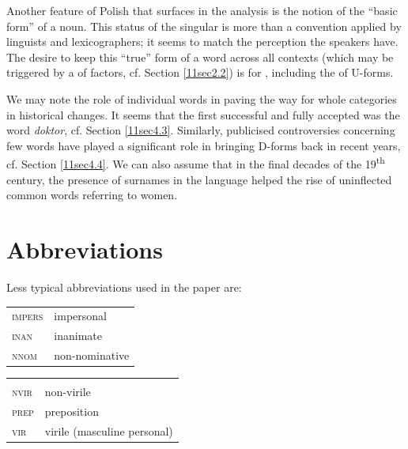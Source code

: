 \documentclass[output=paper,colorlinks,citecolor=brown]{langscibook}
\begin{document}
Another feature of Polish that surfaces in the analysis is the notion of the ``basic form'' of a noun. This status of the  singular is more than a convention applied by linguists and lexicographers; it seems to match the perception the speakers have. The desire to keep this ``true'' form of a word across all contexts (which may be triggered by a  of factors, cf. Section \ref{11sec2.2}) is  for , including the  of U-forms.

We may note the role of individual words in paving the way for whole categories in historical changes. It seems that the first successful and fully accepted  was the word \emph{doktor}, cf. Section \ref{11sec4.3}. Similarly, publicised controversies concerning few words have played a significant role in bringing D-forms back in recent years, cf. Section \ref{11sec4.4}. We can also assume that in the final decades of the 19\textsuperscript{th} century, the presence of  surnames in the language helped the rise of uninflected common words referring to women.
 
 
\section*{Abbreviations}

Less typical abbreviations used in the paper are:
\vspace*{-0.2cm}

\begin{tabularx}{.45\textwidth}{lQ}
\textsc{impers} & impersonal \\
\textsc{inan} & inanimate \\
\textsc{nnom} & non-nominative \\
\end{tabularx}
\begin{tabularx}{.45\textwidth}{lQ}
	& \\
\textsc{nvir} & non-virile \\
\textsc{prep} & preposition \\
\textsc{vir} & virile (masculine personal) \\
\end{tabularx}




{\sloppy\printbibliography[heading=subbibliography,notkeyword=this]}
\end{document}
